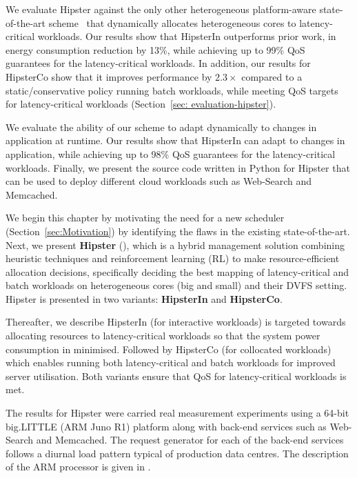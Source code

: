 {\small{}} We evaluate Hipster against the only other heterogeneous
platform-aware state-of-the-art scheme~\citep{Petrucci2015Octopus-Man:Computers} that
dynamically allocates heterogeneous cores to latency-critical workloads. Our results show
that HipsterIn outperforms prior work, in energy consumption reduction by 13\%, while
achieving up to 99\% QoS guarantees for the latency-critical workloads. In addition, our
results for HipsterCo show that it improves performance by $2.3\times$ compared to a
static/conservative policy running batch workloads, while meeting QoS targets for
latency-critical workloads (Section~\ref{sec: evaluation-hipster}).

{\small{}} We evaluate the ability of our scheme to adapt dynamically to changes
in application at runtime. Our results show that HipsterIn can adapt to changes in
application, while achieving up to 98\% QoS guarantees for the latency-critical workloads.
Finally, we present the source code written in Python for Hipster that can be used to
deploy different cloud workloads such as Web-Search and Memcached. 



\iffalse

 We begin this chapter by motivating the need for a new scheduler
(Section~\ref{sec:Motivation}) by identifying the flaws in the existing state-of-the-art.
Next, we present \textbf{Hipster} (), which is a hybrid management solution combining
heuristic techniques and reinforcement learning (RL) to make resource-efficient allocation
decisions, specifically deciding the best mapping of latency-critical and batch workloads
on heterogeneous cores (big and small) and their DVFS setting. Hipster is presented in two
variants: \textbf{HipsterIn} and \textbf{HipsterCo}. 

 Thereafter, we describe HipsterIn (for interactive workloads) is targeted towards
allocating resources to latency-critical workloads so that the system power consumption in
minimised.  Followed by HipsterCo (for collocated workloads)  which enables running both
latency-critical and batch workloads for improved server utilisation. Both variants ensure
that QoS for latency-critical workloads is met. 

 The results for Hipster were carried real measurement experiments using a 64-bit
big.LITTLE (ARM Juno R1) platform along with back-end services such as Web-Search and
Memcached. The request generator for each of the back-end services follows a diurnal load
pattern typical of production data centres. The description of the ARM processor is given
in .

